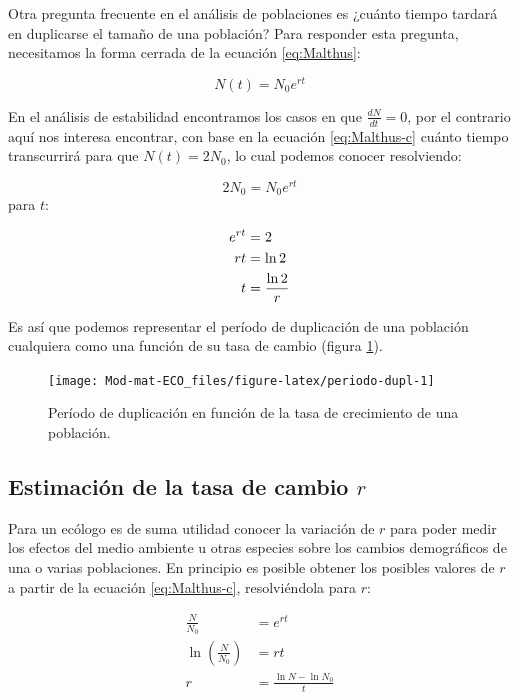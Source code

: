 \documentclass[
]{book}
\begin{document}
Otra pregunta frecuente en el análisis de poblaciones es ¿cuánto tiempo tardará en duplicarse el tamaño de una población? Para responder esta pregunta, necesitamos la forma cerrada de
la ecuación \eqref{eq:Malthus}:

\begin{equation}
N(t) = N_0 e^{rt} \label{eq:Malthus-c}
\end{equation}

En el análisis de estabilidad encontramos los casos en que \(\frac{dN}{dt} = 0\), por el contrario aquí nos interesa encontrar, con base en la ecuación \eqref{eq:Malthus-c} cuánto tiempo transcurrirá para que \(N(t) = 2N_0\), lo cual podemos conocer resolviendo:

\[2N_0 = N_0 e^{rt}\]
para \(t\):

\begin{align}
e^{rt} &= 2\\ \notag
rt &= \ln 2\\ \notag
t &= \frac{\ln 2}{r}
\end{align}

Es así que podemos representar el período de duplicación de una población cualquiera como una función de su tasa de cambio (figura \ref{fig:periodo-dupl}).

\begin{figure}

{\centering \texttt{[image: Mod-mat-ECO\_files/figure-latex/periodo-dupl-1]} 

}

\caption{Período de duplicación en función de la tasa de crecimiento de una población.}\label{fig:periodo-dupl}
\end{figure}

\hypertarget{estimaciuxf3n-de-la-tasa-de-cambio-r}{%
\subsection{\texorpdfstring{Estimación de la tasa de cambio \(r\)}{Estimación de la tasa de cambio r}}\label{estimaciuxf3n-de-la-tasa-de-cambio-r}}

Para un ecólogo es de suma utilidad conocer la variación de \(r\) para poder medir los efectos del medio ambiente u otras especies sobre los cambios demográficos de una o varias poblaciones. En principio es posible obtener los posibles valores de \(r\) a partir de la ecuación \eqref{eq:Malthus-c}, resolviéndola para \(r\):

\begin{align}
\frac{N}{N_0} &= e^{rt}\\
\ln \left(\frac{N}{N_0} \right) &= rt\\
r &= \frac{\ln N - \ln N_0}{t}
\end{align}
\end{document}
